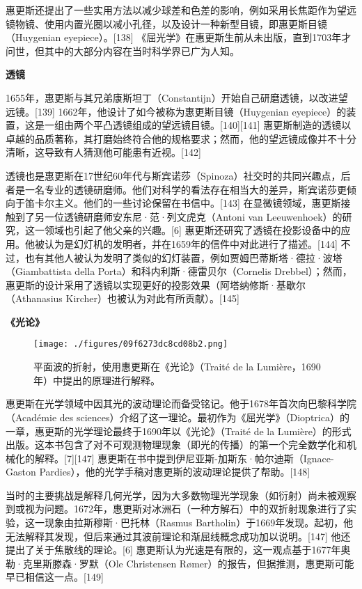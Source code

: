 惠更斯还提出了一些实用方法以减少球差和色差的影响，例如采用长焦距作为望远镜物镜、使用内置光圈以减小孔径，以及设计一种新型目镜，即惠更斯目镜（Huygenian eyepiece）。[138] 《屈光学》在惠更斯生前从未出版，直到1703年才问世，但其中的大部分内容在当时科学界已广为人知。

\textbf{透镜}

1655年，惠更斯与其兄弟康斯坦丁（Constantijn）开始自己研磨透镜，以改进望远镜。[139] 1662年，他设计了如今被称为惠更斯目镜（Huygenian eyepiece）的装置，这是一组由两个平凸透镜组成的望远镜目镜。[140][141] 惠更斯制造的透镜以卓越的品质著称，其打磨始终符合他的规格要求；然而，他的望远镜成像并不十分清晰，这导致有人猜测他可能患有近视。[142]

透镜也是惠更斯在17世纪60年代与斯宾诺莎（Spinoza）社交时的共同兴趣点，后者是一名专业的透镜研磨师。他们对科学的看法存在相当大的差异，斯宾诺莎更倾向于笛卡尔主义。他们的一些讨论保留在书信中。[143] 在显微镜领域，惠更斯接触到了另一位透镜研磨师安东尼·范·列文虎克（Antoni van Leeuwenhoek）的研究，这一领域也引起了他父亲的兴趣。[6] 惠更斯还研究了透镜在投影设备中的应用。他被认为是幻灯机的发明者，并在1659年的信件中对此进行了描述。[144] 不过，也有其他人被认为发明了类似的幻灯装置，例如贾姆巴蒂斯塔·德拉·波塔（Giambattista della Porta）和科内利斯·德雷贝尔（Cornelis Drebbel）；然而，惠更斯的设计采用了透镜以实现更好的投影效果（阿塔纳修斯·基歇尔（Athanasius Kircher）也被认为对此有所贡献）。[145]

\textbf{《光论》}
\begin{figure}[ht]
\centering
\texttt{[image: ./figures/09f6273dc8cd08b2.png]}
\caption{平面波的折射，使用惠更斯在《光论》（Traité de la Lumière，1690年）中提出的原理进行解释。} \label{fig_HGS_14}
\end{figure}
惠更斯在光学领域中因其光的波动理论而备受铭记。他于1678年首次向巴黎科学院（Académie des sciences）介绍了这一理论。最初作为《屈光学》（Dioptrica）的一章，惠更斯的光学理论最终于1690年以《光论》（Traité de la Lumière）的形式出版。这本书包含了对不可观测物理现象（即光的传播）的第一个完全数学化和机械化的解释。[7][147] 惠更斯在书中提到伊尼亚斯-加斯东·帕尔迪斯（Ignace-Gaston Pardies），他的光学手稿对惠更斯的波动理论提供了帮助。[148]

当时的主要挑战是解释几何光学，因为大多数物理光学现象（如衍射）尚未被观察到或视为问题。1672年，惠更斯对冰洲石（一种方解石）中的双折射现象进行了实验，这一现象由拉斯穆斯·巴托林（Rasmus Bartholin）于1669年发现。起初，他无法解释其发现，但后来通过其波前理论和渐屈线概念成功加以说明。[147] 他还提出了关于焦散线的理论。[6] 惠更斯认为光速是有限的，这一观点基于1677年奥勒·克里斯滕森·罗默（Ole Christensen Rømer）的报告，但据推测，惠更斯可能早已相信这一点。[149]

